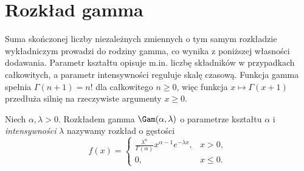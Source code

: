 \section{Rozkład gamma}
Suma skończonej liczby niezależnych zmiennych o tym samym
rozkładzie wykładniczym prowadzi do rodziny gamma,
co wynika z poniższej własności dodawania. Parametr kształtu opisuje m.in. liczbę składników
w przypadkach całkowitych, a parametr intensywności reguluje
skalę czasową. Funkcja gamma spełnia $\Gamma(n+1)=n!$ dla
całkowitego $n\geq0$, więc funkcja $x\mapsto\Gamma(x+1)$
przedłuża silnię na rzeczywiste argumenty $x\geq0$.

\begin{definicja}
Niech $\alpha,\lambda>0$. Rozkładem gamma $\Gam(\alpha,\lambda)$
o parametrze kształtu $\alpha$ i \emph{intensywności} $\lambda$
nazywamy rozkład o gęstości
\begin{equation}\label{eq:gamma}
f(x)=
\begin{cases}
\displaystyle\frac{\lambda^\alpha}{\Gamma(\alpha)}
 x^{\alpha-1}e^{-\lambda x},&x>0,\\
0,&x\leq0.
\end{cases}
\end{equation}
\end{definicja}

